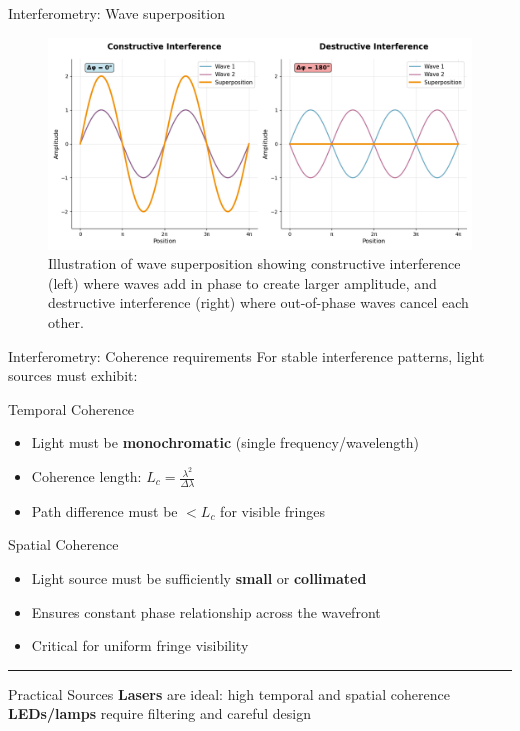 \documentclass{beamer}
\begin{document}
\begin{frame}{Interferometry: Wave superposition}
    \vspace{0.4cm}
    \begin{figure}[h]
        \centering
        \includegraphics[width=1\textwidth]{Figures/constructive-destructive-interferences.png}
        \caption{Illustration of wave superposition showing constructive interference (left) where waves add in phase to create larger amplitude, and destructive interference (right) where out-of-phase waves cancel each other.}
        \label{fig:interference}
    \end{figure}
\end{frame}
\begin{frame}{Interferometry: Coherence requirements}
    For stable interference patterns, light sources must exhibit:
    
    \begin{block}{Temporal Coherence}
        \begin{itemize}
            \item Light must be \textbf{monochromatic} (single frequency/wavelength)
            \item Coherence length: $L_c = \frac{\lambda^2}{\Delta\lambda}$
            \item Path difference must be $< L_c$ for visible fringes
        \end{itemize}
    \end{block}
    
    \begin{block}{Spatial Coherence}
        \begin{itemize}
            \item Light source must be sufficiently \textbf{small} or \textbf{collimated}
            \item Ensures constant phase relationship across the wavefront
            \item Critical for uniform fringe visibility
        \end{itemize}
    \end{block}
    
    \vspace{1em}

    \hrule
    
    \begin{alertblock}{Practical Sources}
        \textbf{Lasers} are ideal: high temporal and spatial coherence \\
        \textbf{LEDs/lamps} require filtering and careful design
    \end{alertblock}
\end{frame}
\end{document}
